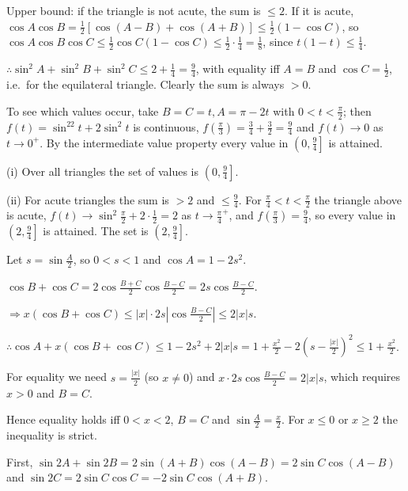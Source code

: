   Upper bound: if the triangle is not acute, the sum is $\leq 2$. If it is acute, $\cos A\cos B
  = \frac{1}{2}[\cos(A - B) + \cos(A + B)]\leq\frac{1}{2}(1 - \cos C)$, so $\cos A\cos B\cos C\leq\frac{1}{2}\cos
  C(1 - \cos C)\leq\frac{1}{2}\cdot\frac{1}{4} = \frac{1}{8}$, since $t(1 - t)\leq\frac{1}{4}$.

  $\therefore\sin^2A + \sin^2B + \sin^2C\leq 2 + \frac{1}{4} = \frac{9}{4}$, with equality iff $A = B$ and
  $\cos C = \frac{1}{2}$, i.e.\ for the equilateral triangle. Clearly the sum is always $> 0$.

  To see which values occur, take $B = C = t, A = \pi - 2t$ with $0 < t < \frac{\pi}{2}$; then $f(t)
  = \sin^22t + 2\sin^2t$ is continuous, $f\left(\frac{\pi}{3}\right) = \frac{3}{4} + \frac{3}{2}
  = \frac{9}{4}$ and $f(t)\to 0$ as $t\to 0^+$. By the intermediate value property every value in $\left(0,
    \frac{9}{4}\right]$ is attained.

  (i) Over all triangles the set of values is $\left(0, \frac{9}{4}\right]$.

  (ii) For acute triangles the sum is $> 2$ and $\leq\frac{9}{4}$. For $\frac{\pi}{4} < t < \frac{\pi}{2}$ the
  triangle above is acute, $f(t)\to\sin^2\frac{\pi}{2} + 2\cdot\frac{1}{2} = 2$ as
  $t\to\frac{\pi}{4}^+$, and $f\left(\frac{\pi}{3}\right) = \frac{9}{4}$, so every value in $\left(2,
    \frac{9}{4}\right]$ is attained. The set is $\left(2, \frac{9}{4}\right]$.
\item Let $s = \sin\frac{A}{2}$, so $0 < s < 1$ and $\cos A = 1 - 2s^2$.

  $\cos B + \cos C = 2\cos\frac{B + C}{2}\cos\frac{B - C}{2} = 2s\cos\frac{B - C}{2}$.

  $\Rightarrow x(\cos B + \cos C)\leq|x|\cdot 2s\left|\cos\frac{B - C}{2}\right|\leq 2|x|s$.

  $\therefore\cos A + x(\cos B + \cos C)\leq 1 - 2s^2 + 2|x|s = 1 + \frac{x^2}{2} - 2\left(s
  - \frac{|x|}{2}\right)^2\leq 1 + \frac{x^2}{2}$.

  For equality we need $s = \frac{|x|}{2}$ (so $x\neq 0$) and $x\cdot 2s\cos\frac{B - C}{2} = 2|x|s$, which
  requires $x > 0$ and $B = C$.

  Hence equality holds iff $0 < x < 2$, $B = C$ and $\sin\frac{A}{2} = \frac{x}{2}$. For $x\leq 0$ or $x\geq
  2$ the inequality is strict.
\item First, $\sin2A + \sin2B = 2\sin(A + B)\cos(A - B) = 2\sin C\cos(A - B)$ and $\sin2C = 2\sin C\cos C
  = -2\sin C\cos(A + B)$.

